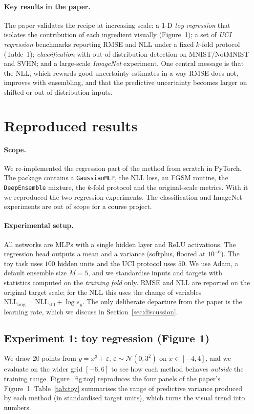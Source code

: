\documentclass{article}
\begin{document}
\paragraph{Key results in the paper.}
The paper validates the recipe at increasing scale: a 1-D \emph{toy regression}
that isolates the contribution of each ingredient visually (Figure~1); a set of
\emph{UCI regression} benchmarks reporting RMSE and NLL under a fixed $k$-fold
protocol (Table~1); \emph{classification} with out-of-distribution detection on
MNIST/NotMNIST and SVHN; and a large-scale \emph{ImageNet} experiment. One
central message is that the NLL, which rewards good uncertainty estimates in a
way RMSE does not, improves with ensembling, and that the predictive uncertainty
becomes larger on shifted or out-of-distribution inputs.

\section{Reproduced results}

\paragraph{Scope.}
We re-implemented the regression part of the method from scratch in PyTorch.
The package contains a \texttt{GaussianMLP}, the NLL loss, an FGSM routine, the
\texttt{DeepEnsemble} mixture, the $k$-fold protocol and the original-scale
metrics. With it we reproduced the two regression experiments. The
classification and ImageNet experiments are out of scope for a course project.

\paragraph{Experimental setup.}
All networks are MLPs with a single hidden layer and ReLU activations. The
regression head outputs a mean and a variance (softplus, floored at $10^{-6}$).
The toy task uses $100$ hidden units and the UCI protocol uses $50$. We use
Adam, a default ensemble size $M=5$, and we standardise inputs and targets with
statistics computed on the \emph{training fold} only. RMSE and NLL are reported
on the original target scale; for the NLL this uses the change of variables
$\mathrm{NLL}_{\text{orig}}=\mathrm{NLL}_{\text{std}}+\log s_y$. The only
deliberate departure from the paper is the learning rate, which we discuss in
Section~\ref{sec:discussion}.

\subsection{Experiment 1: toy regression (Figure 1)}
We draw $20$ points from $y=x^3+\varepsilon$, $\varepsilon\sim\mathcal{N}(0,3^2)$
on $x\in[-4,4]$, and we evaluate on the wider grid $[-6,6]$ to see how each
method behaves \emph{outside} the training range. Figure~\ref{fig:toy}
reproduces the four panels of the paper's Figure~1. Table~\ref{tab:toy}
summarises the range of predictive variance produced by each method (in
standardised target units), which turns the visual trend into numbers.
\end{document}
